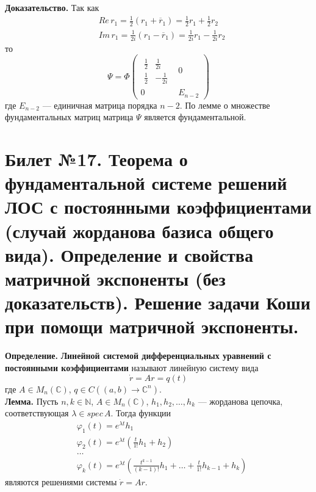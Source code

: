 \documentclass{article}
\begin{document}
\noindent \textbf{Доказательство.} Так как
\begin{equation*}
    \begin{aligned}
        &Re\, r_1 = \frac{1}{2}(r_1 + \overline{r}_1) = \frac{1}{2}r_1 + \frac{1}{2}r_2\\
        &Im\,r_1 = \frac{1}{2i}(r_1 - \overline{r}_1) = \frac{1}{2i}r_1 - \frac{1}{2i}r_2
    \end{aligned}
\end{equation*}
то
\begin{equation*}
    \Psi = \Phi \begin{pmatrix}
    \begin{matrix}
    \frac{1}{2} & \frac{1}{2i}\\
    \frac{1}{2} & -\frac{1}{2i}
    \end{matrix} & 0\\
    0 & E_{n-2}
    \end{pmatrix}
\end{equation*}
где $E_{n-2}$ --- единичная матрица порядка $n - 2$. По лемме о множестве фундаментальных матриц матрица $\Psi$ является фундаментальной.

\section{Билет №17. Теорема о фундаментальной системе решений ЛОС с постоянными коэффициентами (случай жорданова базиса общего вида). Определение и свойства матричной экспоненты (без доказательств). Решение задачи Коши при помощи матричной экспоненты.}
\textbf{Определение.} \textbf{Линейной системой дифференциальных уравнений с постоянными коэффициентами} называют линейную систему вида
\begin{equation}
    \dot{r} = Ar = q(t) \label{linpost}
\end{equation}
где $A \in M_n(\mathbb{C})$, $q \in C((a,b) \to \mathbb{C}^n)$.\\

\noindent \textbf{Лемма.} Пусть $n, k \in \mathbb{N}$, $A \in M_n(\mathbb{C})$, $h_1, h_2, \ldots, h_k$ --- жорданова цепочка, соответствующая $\lambda \in spec\, A$. Тогда функции
\begin{equation*}
    \begin{aligned}
        &\varphi_1(t) = e^{\lambda t}h_1\\
        &\varphi_2(t) = e^{\lambda t}\left(\frac{t}{1!}h_1 + h_2\right)\\
        &\ldots\\
        &\varphi_k(t) = e^{\lambda t}\left(\frac{t^{k-1}}{(k-1)!}h_1 + \ldots + \frac{t}{1!}h_{k-1} + h_k\right)
    \end{aligned}
\end{equation*}
являются решениями системы $\dot{r} = Ar$.\\
\end{document}
